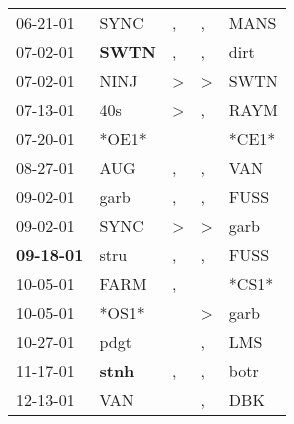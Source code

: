\begin{supertabular}{p{0.07\textwidth}p{0.06\textwidth}p{0.02\textwidth}p{0.02\textwidth}p{0.06\textwidth}}
          06-21-01\textsuperscript{} &           SYNC\textsuperscript{} &                , &                , &           MANS\textsuperscript{} \\
          07-02-01\textsuperscript{} &  \textbf{SWTN\textsuperscript{}} &                , &                , &           dirt\textsuperscript{} \\
          07-02-01\textsuperscript{} &           NINJ\textsuperscript{} &     \textgreater &     \textgreater &           SWTN\textsuperscript{} \\
          07-13-01\textsuperscript{} &            40s\textsuperscript{} &     \textgreater &                , &           RAYM\textsuperscript{} \\
          07-20-01\textsuperscript{} &                            *OE1* &                  &                  &                            *CE1* \\
          08-27-01\textsuperscript{} &            AUG\textsuperscript{} &                , &                , &            VAN\textsuperscript{} \\
          09-02-01\textsuperscript{} &           garb\textsuperscript{} &                , &                , &           FUSS\textsuperscript{} \\
          09-02-01\textsuperscript{} &           SYNC\textsuperscript{} &     \textgreater &     \textgreater &           garb\textsuperscript{} \\
 \textbf{09-18-01\textsuperscript{}} &           stru\textsuperscript{} &                , &                , &           FUSS\textsuperscript{} \\
          10-05-01\textsuperscript{} &           FARM\textsuperscript{} &                , &                  &                            *CS1* \\
          10-05-01\textsuperscript{} &                            *OS1* &                  &     \textgreater &           garb\textsuperscript{} \\
          10-27-01\textsuperscript{} &           pdgt\textsuperscript{} &                  &                , &            LMS\textsuperscript{} \\
          11-17-01\textsuperscript{} &  \textbf{stnh\textsuperscript{}} &                , &                , &           botr\textsuperscript{} \\
          12-13-01\textsuperscript{} &            VAN\textsuperscript{} &                  &                , &            DBK\textsuperscript{} \\

\end{supertabular}
